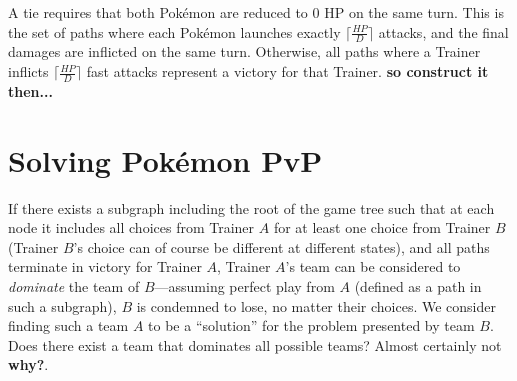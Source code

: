 A tie requires that both Pokémon are reduced to 0 HP on the same turn.
This is the set of paths where each Pokémon launches exactly $\lceil\frac{HP}{D}\rceil$
  attacks, and the final damages are inflicted on the same turn.
Otherwise, all paths where a Trainer inflicts $\lceil\frac{HP}{D}\rceil$ fast attacks
  represent a victory for that Trainer.
\textbf{so construct it then...}

\section{Solving Pokémon PvP}
If there exists a subgraph including the root of the game tree such that at each
  node it includes all choices from Trainer $A$ for at least one choice from Trainer $B$
  (Trainer $B$'s choice can of course be different at different states), and all
  paths terminate in victory for Trainer $A$, Trainer $A$'s team can be considered
  to \textit{dominate} the team of $B$---assuming perfect play from $A$ (defined
  as a path in such a subgraph), $B$ is condemned to lose, no matter their choices.
We consider finding such a team $A$ to be a ``solution'' for the problem presented
  by team $B$.
Does there exist a team that dominates all possible teams?
Almost certainly not \textbf{why?}.
